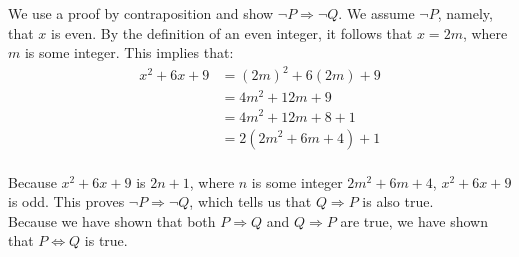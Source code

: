 \documentclass[11pt]{article}
\begin{document}
We use a proof by contraposition and show $\lnot P \Rightarrow \lnot Q$. We assume $\lnot P$, namely, that $x$ is even. By the definition of an even integer, it follows that $x = 2m$, where $m$ is some integer. 
This implies that:\\
\begin{align*}
  x^2 + 6x + 9 &= (2m)^2 + 6(2m) + 9 \\
  &= 4m^2 + 12m + 9 \\
  &= 4m^2 + 12m + 8 + 1 \\
  &= 2(2m^2 + 6m + 4) + 1 \\
\end{align*}

Because $x^2 + 6x + 9$ is $2n + 1$, where $n$ is some integer $2m^2 + 6m + 4$, $x^2 + 6x + 9$ is odd. This proves $\lnot P \Rightarrow \lnot Q$, which tells us that $Q \Rightarrow P$ is also true. \\[\baselineskip]

Because we have shown that both $P \Rightarrow Q$ and $Q \Rightarrow P$ are true, we have shown that $P \Leftrightarrow Q$ is true.
\end{document}
